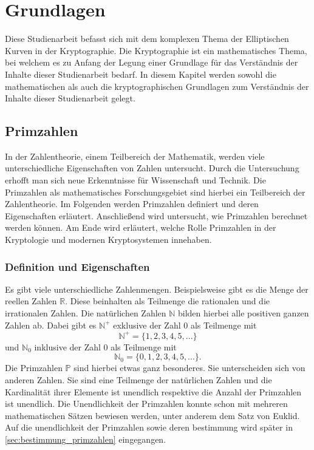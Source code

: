 \chapter{Grundlagen}
Diese Studienarbeit befasst sich mit dem komplexen Thema der Elliptischen Kurven in der Kryptographie. Die Kryptographie ist ein mathematisches Thema, bei welchem es zu Anfang der Legung einer Grundlage für das Verständnis der Inhalte dieser Studienarbeit bedarf. In diesem Kapitel werden sowohl die mathematischen als auch die kryptographischen Grundlagen zum Verständnis der Inhalte dieser Studienarbeit gelegt.


\section{Primzahlen}
In der Zahlentheorie, einem Teilbereich der Mathematik, werden viele unterschiedliche Eigenschaften von Zahlen untersucht. Durch die Untersuchung erhofft man sich neue Erkenntnisse für Wissenschaft und Technik. Die Primzahlen als mathematisches Forschungsgebiet sind hierbei ein Teilbereich der Zahlentheorie. Im Folgenden werden Primzahlen definiert und deren Eigenschaften erläutert. Anschließend wird untersucht, wie Primzahlen berechnet werden können. Am Ende wird erläutert, welche Rolle Primzahlen in der Kryptologie und modernen Kryptosystemen innehaben.

\subsection{Definition und Eigenschaften}
Es gibt viele unterschiedliche Zahlenmengen. Beispielsweise gibt es die Menge der reellen Zahlen $\mathbb{R}$. Diese beinhalten als Teilmenge die rationalen und die irrationalen Zahlen. Die natürlichen Zahlen $\mathbb{N}$ bilden hierbei alle positiven ganzen Zahlen ab. Dabei gibt es $\mathbb{N^{+}}$ exklusive der Zahl 0 als Teilmenge mit \[\mathbb{N^{+}} = \{1, 2, 3, 4, 5, ...\}\] und $\mathbb{N}_0$ inklusive der Zahl 0 als Teilmenge mit \[\mathbb{N}_0 = \{0, 1, 2, 3, 4, 5, ...\}.\] Die Primzahlen $\mathbb{P}$ sind hierbei etwas ganz besonderes. Sie unterscheiden sich von anderen Zahlen. Sie sind eine Teilmenge der natürlichen Zahlen und die Kardinalität ihrer Elemente ist unendlich respektive die Anzahl der Primzahlen ist unendlich. Die Unendlichkeit der Primzahlen konnte schon mit mehreren mathematischen Sätzen bewiesen werden, unter anderem dem Satz von Euklid. Auf die unendlichkeit der Primzahlen sowie deren bestimmung wird später in \ref{sec:bestimmung_primzahlen} eingegangen.\\

